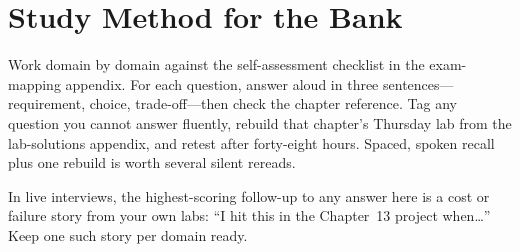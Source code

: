 \section{Study Method for the Bank}
Work domain by domain against the self-assessment checklist in the exam-mapping appendix. For each
question, answer aloud in three sentences---requirement, choice, trade-off---then check the chapter
reference. Tag any question you cannot answer fluently, rebuild that chapter's Thursday lab from
the lab-solutions appendix, and retest after forty-eight hours. Spaced, spoken recall plus one
rebuild is worth several silent rereads.

\begin{tipbox}
In live interviews, the highest-scoring follow-up to any answer here is a cost or failure story
from your own labs: ``I hit this in the Chapter~13 project when\ldots'' Keep one such story per
domain ready.
\end{tipbox}
